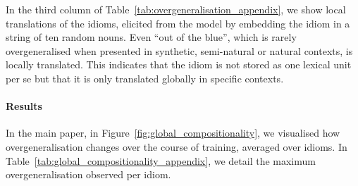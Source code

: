 In the third column of Table~\ref{tab:overgeneralisation_appendix}, we show local translations of the idioms, elicited from the model by embedding the idiom in a string of ten random nouns. 
Even ``out of the blue'', which is rarely overgeneralised when presented in synthetic, semi-natural or natural contexts, is locally translated. 
This indicates that the idiom is not stored as one lexical unit per se but that it is only translated globally in specific contexts.

\paragraph{Results}
In the main paper, in Figure~\ref{fig:global_compositionality}, we visualised how overgeneralisation changes over the course of training, averaged over idioms.
In Table~\ref{tab:global_compositionality_appendix}, we detail the maximum overgeneralisation observed per idiom.

